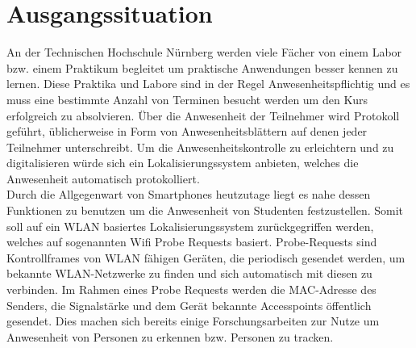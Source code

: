 \section{Ausgangssituation}

An der Technischen Hochschule Nürnberg werden viele Fächer von einem Labor bzw. einem Praktikum begleitet um praktische Anwendungen besser kennen zu lernen.
Diese Praktika und Labore sind in der Regel Anwesenheitspflichtig und es muss eine bestimmte Anzahl von Terminen besucht werden um den Kurs erfolgreich zu absolvieren.
Über die Anwesenheit der Teilnehmer wird Protokoll geführt, üblicherweise in Form von Anwesenheitsblättern auf denen jeder Teilnehmer unterschreibt.
Um die Anwesenheitskontrolle zu erleichtern und zu digitalisieren würde sich ein Lokalisierungssystem anbieten, welches die Anwesenheit automatisch protokolliert.
\\

Durch die Allgegenwart von Smartphones heutzutage liegt es nahe dessen Funktionen zu benutzen um die Anwesenheit von Studenten festzustellen.
Somit soll auf ein WLAN basiertes Lokalisierungssystem zurückgegriffen werden, welches auf sogenannten Wifi Probe Requests basiert.
Probe-Requests sind Kontrollframes von WLAN fähigen Geräten, die periodisch gesendet werden, um bekannte WLAN-Netzwerke zu finden und sich automatisch mit diesen zu verbinden. \cite{wifiproberequests2019}
Im Rahmen eines Probe Requests werden die MAC-Adresse des Senders, die Signalstärke und dem Gerät bekannte Accesspoints öffentlich gesendet.
Dies machen sich bereits einige Forschungsarbeiten zur Nutze um Anwesenheit von Personen zu erkennen bzw. Personen zu tracken. \cite{sail2014,sherlock2018}